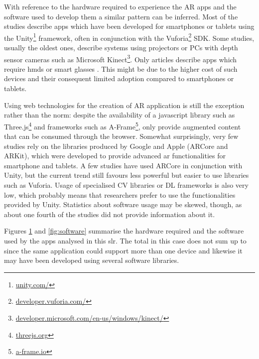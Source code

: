 With reference to the hardware required to experience the AR apps and the software used to develop them a similar pattern can be inferred. Most of the studies describe apps which have been developed for smartphones or tablets using the Unity\footnote{\url{unity.com/}} framework, often in conjunction with the Vuforia\footnote{\url{developer.vuforia.com/}} \gls{SDK}. Some studies, usually the oldest ones, describe systems using projectors or PCs with depth sensor cameras such as Microsoft Kinect\footnote{\url{developer.microsoft.com/en-us/windows/kinect/}}. Only \hardwareHMD articles describe apps which require \glspl{hmd} or smart glasses \citep{ oh2016designing, oh2017hybrid, matsutomo2017computer, khan2018mathland, wei2018improving, kum2019ar, radu2022augmented, resnyansky2022tangible}. This might be due to the higher cost of such devices and their consequent limited adoption compared to smartphones or tablets.

Using web technologies for the creation of AR application is still the exception rather than the norm: despite the availability of a javascript library such as Three.js\footnote{\url{threejs.org}} and frameworks such as A-Frame\footnote{\url{a-frame.io}}, only \cite{abriata2020building, protopsaltis2016quiz, rodriguez2021molecularweb} provide augmented content that can be consumed through the browser.
Somewhat surprisingly, very few studies rely on the libraries produced by Google and Apple (ARCore and ARKit), which were developed to provide advanced \gls{ar} functionalities for smartphone and tablets. A few studies \citep{carlos2021voluminis, costa2021interactive, acosta2020applying} have used ARCore in conjunction with Unity, but the current trend still favours less powerful but easier to use libraries such as Vuforia. Usage of specialised \gls{CV} libraries or \gls{DL} frameworks is also very low, which probably means that researchers prefer to use the functionalities provided by Unity. Statistics about software usage may be skewed, though, as about one fourth of the studies did not provide information about it.

Figures \ref{fig:hardware} and \ref{fig:software} summarise the hardware required and the software used by the apps analysed in this \gls{slr}. The total in this case does not sum up to \papersSelected since the same application could support more than one device and likewise it may have been developed using several software libraries.

\begin{figure}[htbp]	
	\begin{center}
	
	\captionsetup{font=small}
	\caption{\fontsize{10pt}{11pt}}
	\label{fig:hardware}
    \end{center}
\end{figure}

